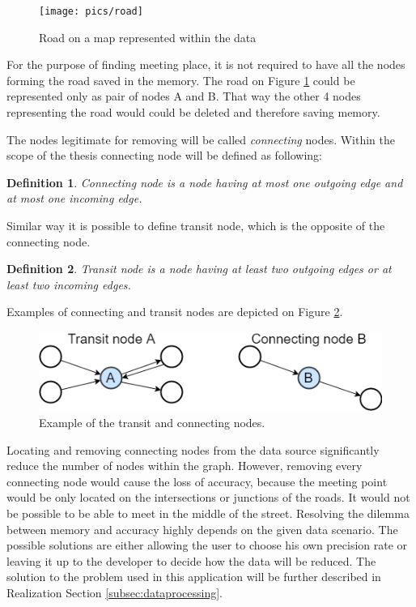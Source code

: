 \documentclass[thesis=M,english]{FITthesis}[2012/10/20]
\newtheorem{defin}{Definition}
\begin{document}
\begin{figure}[H]
\centering
\texttt{[image: pics/road]}
\caption{Road on a map represented within the data}
\label{pic:Road}
\end{figure}

For the purpose of finding meeting place, it is not required to have all the nodes forming the road saved in the memory. The road on Figure \ref{pic:Road} could be represented only as pair of nodes A and B. That way the other 4 nodes representing the road would could be deleted and therefore saving memory. 

The nodes legitimate for removing will be called \textit{connecting} nodes. Within the scope of the thesis connecting node will be defined as following:

\begin{defin}
\label{def:connect}
Connecting node is a node having at most one outgoing edge and at most one incoming edge. 
\end{defin}

Similar way it is possible to define transit node, which is the opposite of the connecting node. 

\begin{defin}
\label{def:transit}
Transit node is a node having at least two outgoing edges or at least two incoming edges. 
\end{defin}

Examples of connecting and transit nodes are depicted on Figure \ref{pic:CaTnodes}.

\begin{figure}[H]
\centering
\includegraphics[width=1\textwidth]{pics/CaTNodes}
\caption{Example of the transit and connecting nodes.}
\label{pic:CaTnodes}
\end{figure}


Locating and removing connecting nodes from the data source significantly reduce the number of nodes within the graph. However, removing every connecting node would cause the loss of accuracy, because the meeting point would be only located on the intersections or junctions of the roads. It would not be possible to be able to meet in the middle of the street. 
Resolving the dilemma between memory and accuracy highly depends on the given data scenario. The possible solutions are either allowing the user to choose his own precision rate or leaving it up to the developer to decide how the data will be reduced. The solution to the problem used in this application will be further described in Realization Section \ref{subsec:dataprocessing}.
\end{document}

